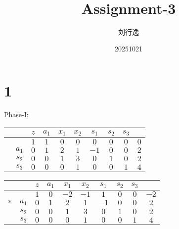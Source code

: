 \documentclass[a4paper,12pt]{article}
\title{Assignment-3}
\author{刘行逸}
\date{20251021}
\begin{document}
\maketitle

\section*{1}
Phase-I:
\begin{table}[H]
    \footnotesize
    \begin{tabular}{cc|ccccccc|c}
         &       & $z$ & $a_1$ & $x_1$ & $x_2$ & $s_1$ & $s_2$ & $s_3$ &     \\
        \hline
         &       & $1$ & $1$   & $0$   & $0$   & $0$   & $0$   & $0$   & $0$ \\
        \hline
         & $a_1$ & $0$ & $1$   & $2$   & $1$   & $-1$  & $0$   & $0$   & $2$ \\
         & $s_2$ & $0$ & $0$   & $1$   & $3$   & $0$   & $1$   & $0$   & $2$ \\
         & $s_3$ & $0$ & $0$   & $0$   & $1$   & $0$   & $0$   & $1$   & $4$ \\
    \end{tabular}
\end{table}

\begin{table}[H]
    \footnotesize
    \begin{tabular}{cc|ccccccc|c}
            &       & $z$ & $a_1$ & $x_1$ & $x_2$ & $s_1$ & $s_2$ & $s_3$ &      \\
        \hline
            &       & $1$ & $0$   & $-2$  & $-1$  & $1$   & $0$   & $0$   & $-2$ \\
        \hline
        $*$ & $a_1$ & $0$ & $1$   & $2$   & $1$   & $-1$  & $0$   & $0$   & $2$  \\
            & $s_2$ & $0$ & $0$   & $1$   & $3$   & $0$   & $1$   & $0$   & $2$  \\
            & $s_3$ & $0$ & $0$   & $0$   & $1$   & $0$   & $0$   & $1$   & $4$  \\
    \end{tabular}
\end{table}
\end{document}
